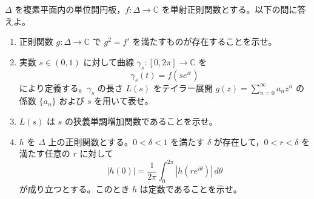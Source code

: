 \documentclass[12pt]{jlreq}
\begin{document}
$\Delta$ を複素平面内の単位開円板，$f : \Delta \to \mathbb{C}$ を単射正則関数とする。以下の問に答えよ。

\begin{enumerate}
  \item 正則関数 $g : \Delta \to \mathbb{C}$ で $g^2 = f'$ を満たすものが存在することを示せ。
  \item 実数 $s \in (0,1)$ に対して曲線 $\gamma_s : [0,2\pi] \to \mathbb{C}$ を
  \[
    \gamma_s(t) = f(se^{it})
  \]
  により定義する。$\gamma_s$ の長さ $L(s)$ をテイラー展開 $g(z) = \sum_{n=0}^\infty a_n z^n$ の係数 $\{a_n\}$ および $s$ を用いて表せ。
  \item $L(s)$ は $s$ の狭義単調増加関数であることを示せ。
  \item $h$ を $\Delta$ 上の正則関数とする。$0 < \delta < 1$ を満たす $\delta$ が存在して，$0 < r < \delta$ を満たす任意の $r$ に対して
  \[
    |h(0)| = \frac{1}{2\pi} \int_0^{2\pi} |h(re^{i\theta})| \, d\theta
  \]
  が成り立つとする。このとき $h$ は定数であることを示せ。
\end{enumerate}
\end{document}

